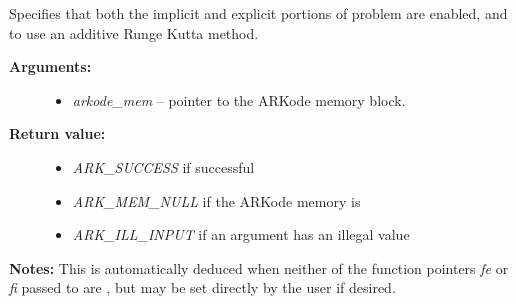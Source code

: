 \documentclass[letterpaper,10pt,english]{sphinxmanual}
\begin{document}
\begin{fulllineitems}
\label{c_interface/User_callable:c.ARKodeSetImEx}
Specifies that both the implicit and explicit portions
of problem are enabled, and to use an additive Runge Kutta method.
\begin{description}
\item[{\textbf{Arguments:}}] \leavevmode\begin{itemize}
\item {} 
\emph{arkode\_mem} -- pointer to the ARKode memory block.

\end{itemize}

\item[{\textbf{Return value:}}] \leavevmode\begin{itemize}
\item {} 
\emph{ARK\_SUCCESS} if successful

\item {} 
\emph{ARK\_MEM\_NULL} if the ARKode memory is 

\item {} 
\emph{ARK\_ILL\_INPUT} if an argument has an illegal value

\end{itemize}

\end{description}

\textbf{Notes:} This is automatically deduced when neither of the function
pointers \emph{fe} or \emph{fi} passed to {\hyperref[c_interface/User_callable:c.ARKodeInit]{\emph{}}} are , but
may be set directly by the user if desired.

\end{fulllineitems}

\end{document}
